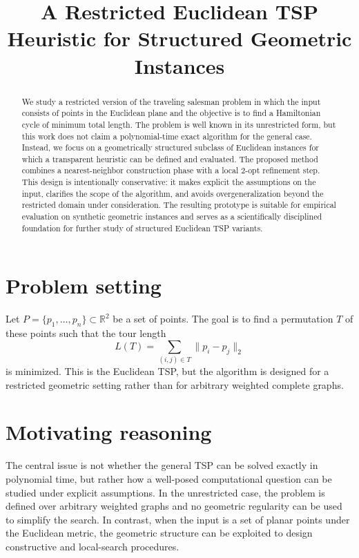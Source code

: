 \documentclass[11pt]{article}
\title{A Restricted Euclidean TSP Heuristic for Structured Geometric Instances}
\author{}
\date{}
\begin{document}
\maketitle

\begin{abstract}
We study a restricted version of the traveling salesman problem in which the input consists of points in the Euclidean plane and the objective is to find a Hamiltonian cycle of minimum total length. The problem is well known in its unrestricted form, but this work does not claim a polynomial-time exact algorithm for the general case. Instead, we focus on a geometrically structured subclass of Euclidean instances for which a transparent heuristic can be defined and evaluated. The proposed method combines a nearest-neighbor construction phase with a local 2-opt refinement step. This design is intentionally conservative: it makes explicit the assumptions on the input, clarifies the scope of the algorithm, and avoids overgeneralization beyond the restricted domain under consideration. The resulting prototype is suitable for empirical evaluation on synthetic geometric instances and serves as a scientifically disciplined foundation for further study of structured Euclidean TSP variants.
\end{abstract}

\section{Problem setting}

Let $P = \{p_1, \dots, p_n\} \subset \mathbb{R}^2$ be a set of points. The goal is to find a permutation $T$ of these points such that the tour length
\[
L(T) = \sum_{(i,j) \in T} \|p_i - p_j\|_2
\]
is minimized. This is the Euclidean TSP, but the algorithm is designed for a restricted geometric setting rather than for arbitrary weighted complete graphs.

\section{Motivating reasoning}

The central issue is not whether the general TSP can be solved exactly in polynomial time, but rather how a well-posed computational question can be studied under explicit assumptions. In the unrestricted case, the problem is defined over arbitrary weighted graphs and no geometric regularity can be used to simplify the search. In contrast, when the input is a set of planar points under the Euclidean metric, the geometric structure can be exploited to design constructive and local-search procedures.
\end{document}
